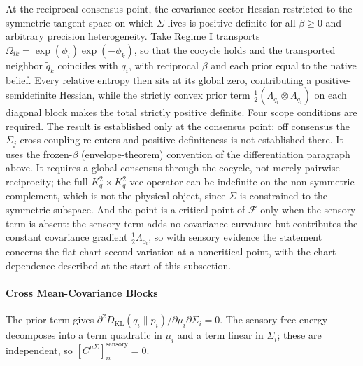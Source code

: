 \documentclass[11pt]{article}
\begin{document}
At the reciprocal-consensus point, the covariance-sector Hessian restricted to the symmetric tangent space on which $\Sigma$ lives is positive definite for all $\beta \geq 0$ and arbitrary precision heterogeneity. Take Regime I transports $\Omega_{ik} = \exp(\phi_i)\exp(-\phi_k)$, so that the cocycle holds and the transported neighbor $\tilde{q}_k$ coincides with $q_i$, with reciprocal $\beta$ and each prior equal to the native belief. Every relative entropy then sits at its global zero, contributing a positive-semidefinite Hessian, while the strictly convex prior term $\frac{1}{2}(\Lambda_{q_i} \otimes \Lambda_{q_i})$ on each diagonal block makes the total strictly positive definite. Four scope conditions are required. The result is established only at the consensus point; off consensus the $\Sigma_j$ cross-coupling re-enters and positive definiteness is not established there. It uses the frozen-$\beta$ (envelope-theorem) convention of the differentiation paragraph above. It requires a global consensus through the cocycle, not merely pairwise reciprocity; the full $K_q^2 \times K_q^2$ vec operator can be indefinite on the non-symmetric complement, which is not the physical object, since $\Sigma$ is constrained to the symmetric subspace. And the point is a critical point of $\mathcal{F}$ only when the sensory term is absent: the sensory term adds no covariance curvature but contributes the constant covariance gradient $\tfrac12\Lambda_{o_i}$, so with sensory evidence the statement concerns the flat-chart second variation at a noncritical point, with the chart dependence described at the start of this subsection.

\paragraph{Cross Mean-Covariance Blocks}

The prior term gives $\partial^2 D_{\mathrm{KL}}(q_i \| p_i)/\partial \mu_i \partial \Sigma_i = 0$. The sensory free energy decomposes into a term quadratic in $\mu_i$ and a term linear in $\Sigma_i$; these are independent, so $[C^{\mu\Sigma}]_{ii}^{\mathrm{sensory}} = 0$.
\end{document}

